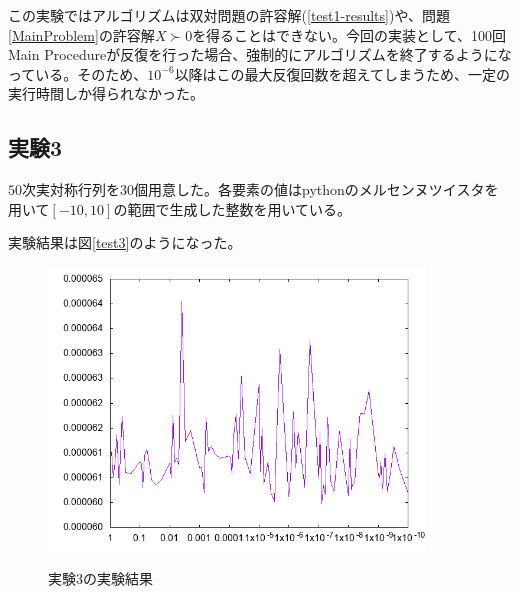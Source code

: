 この実験ではアルゴリズムは双対問題の許容解(\ref{test1-results})や、問題\ref{MainProblem}の許容解$X \succ 0$を得ることはできない。今回の実装として、100回Main Procedureが反復を行った場合、強制的にアルゴリズムを終了するようになっている。そのため、$10^{-6}$以降はこの最大反復回数を超えてしまうため、一定の実行時間しか得られなかった。

\subsection{実験3}
$50$次実対称行列を30個用意した。各要素の値はpythonのメルセンヌツイスタを用いて$[-10,10]$の範囲で生成した整数を用いている。

実験結果は図\ref{test3}のようになった。
\begin{figure}
  \centering
  \includegraphics[width=10cm]{randomtest.png}
  \label{randomtest-results}
  \caption{実験3の実験結果}
\end{figure}

